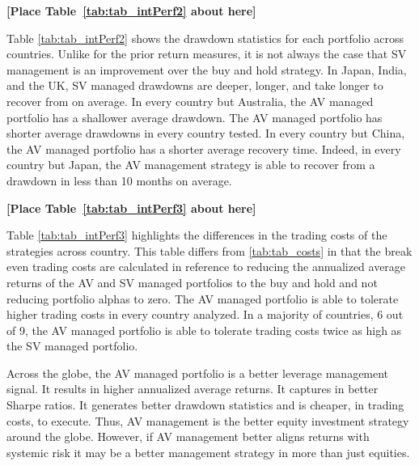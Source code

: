 \bigskip
\centerline{\bf [Place Table~\ref{tab:tab_intPerf2} about here]}
\bigskip

Table \ref{tab:tab_intPerf2} shows the drawdown statistics for each portfolio across countries. Unlike for the prior return measures, it is not always the case that SV management is an improvement over the buy and hold strategy. In Japan, India, and the UK, SV managed drawdowns are deeper, longer, and take longer to recover from on average. In every country but Australia, the AV managed portfolio has a shallower average drawdown. The AV managed portfolio has shorter average drawdowns in every country tested. In every country but China, the AV managed portfolio has a shorter average recovery time. Indeed, in every country but Japan, the AV management strategy is able to recover from a drawdown in less than 10 months on average.

\bigskip
\centerline{\bf [Place Table~\ref{tab:tab_intPerf3} about here]}
\bigskip

Table \ref{tab:tab_intPerf3} highlights the differences in the trading costs of the strategies across country. This table differs from \ref{tab:tab_costs} in that the break even trading costs are calculated in reference to reducing the annualized average returns of the AV and SV managed portfolios to the buy and hold and not reducing portfolio alphas to zero. The AV managed portfolio is able to tolerate higher trading costs in every country analyzed. In a majority of countries, 6 out of 9, the AV managed portfolio is able to tolerate trading costs twice as high as the SV managed portfolio.

Across the globe, the AV managed portfolio is a better leverage management signal. It results in higher annualized average returns. It captures in better Sharpe ratios. It generates better drawdown statistics and is cheaper, in trading costs, to execute. Thus, AV management is the better equity investment strategy around the globe. However, if AV management better aligns returns with systemic risk it may be a better management strategy in more than just equities.
